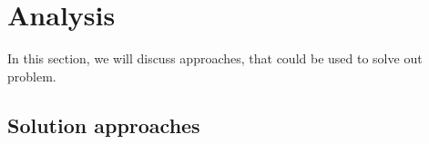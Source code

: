\chapter{Analysis}
In this section, we will discuss approaches, that could be used to solve out problem.

\section{Solution approaches}
